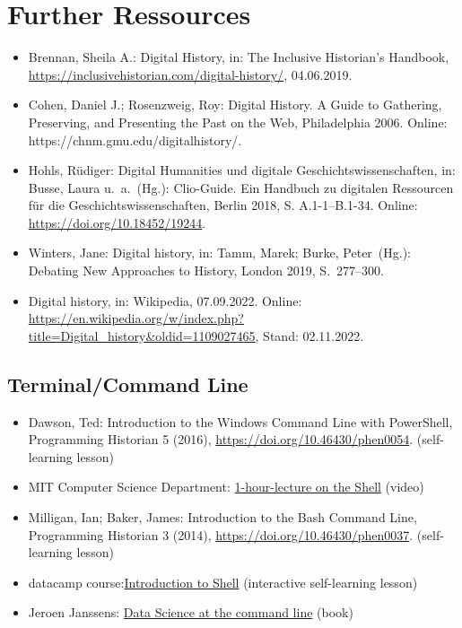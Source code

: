 \documentclass[
  letterpaper,
]{book}
\begin{document}
\hypertarget{further-ressources}{%
\chapter{Further Ressources}\label{further-ressources}}

\begin{itemize}
\item
  Brennan, Sheila A.: Digital History, in: The Inclusive Historian's
  Handbook, \url{https://inclusivehistorian.com/digital-history/},
  04.06.2019.
\item
  Cohen, Daniel J.; Rosenzweig, Roy: Digital History. A Guide to
  Gathering, Preserving, and Presenting the Past on the Web,
  Philadelphia 2006. Online: https://chnm.gmu.edu/digitalhistory/.
\item
  Hohls, Rüdiger: Digital Humanities und digitale
  Geschichtswissenschaften, in: Busse, Laura u.~a.~(Hg.): Clio-Guide.
  Ein Handbuch zu digitalen Ressourcen für die Geschichtswissenschaften,
  Berlin 2018, S. A.1-1--B.1-34. Online:
  \url{https://doi.org/10.18452/19244}.
\item
  Winters, Jane: Digital history, in: Tamm, Marek; Burke, Peter~(Hg.):
  Debating New Approaches to History, London 2019, S.~277--300.
\item
  Digital history, in: Wikipedia, 07.09.2022. Online:
  \url{https://en.wikipedia.org/w/index.php?title=Digital_history\&oldid=1109027465},
  Stand: 02.11.2022.
\end{itemize}

\hypertarget{terminalcommand-line}{%
\section{Terminal/Command Line}\label{terminalcommand-line}}

\begin{itemize}
\item
  Dawson, Ted: Introduction to the Windows Command Line with PowerShell,
  Programming Historian 5 (2016),
  \url{https://doi.org/10.46430/phen0054}. (self-learning lesson)
\item
  MIT Computer Science Department:
  \href{https://missing.csail.mit.edu/2020/course-shell/}{1-hour-lecture
  on the Shell} (video)
\item
  Milligan, Ian; Baker, James: Introduction to the Bash Command Line,
  Programming Historian 3 (2014),
  \url{https://doi.org/10.46430/phen0037}. (self-learning lesson)
\item
  datacamp
  course:\href{https://app.datacamp.com/learn/courses/introduction-to-shell}{Introduction
  to Shell} (interactive self-learning lesson)
\item
  Jeroen Janssens: \href{https://datascienceatthecommandline.com/}{Data
  Science at the command line} (book)
\end{itemize}
\end{document}
